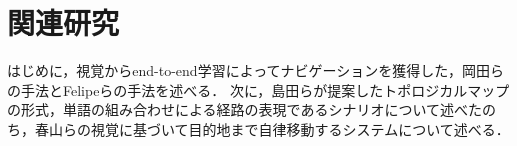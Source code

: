 \chapter{関連研究}
\label{chap:prior}
はじめに，視覚からend-to-end学習によってナビゲーションを獲得した，岡田らの手法とFelipeらの手法を述べる．
次に，島田らが提案したトポロジカルマップの形式，単語の組み合わせによる経路の表現であるシナリオについて述べたのち，春山らの視覚に基づいて目的地まで自律移動するシステムについて述べる．

\clearpage



\clearpage


